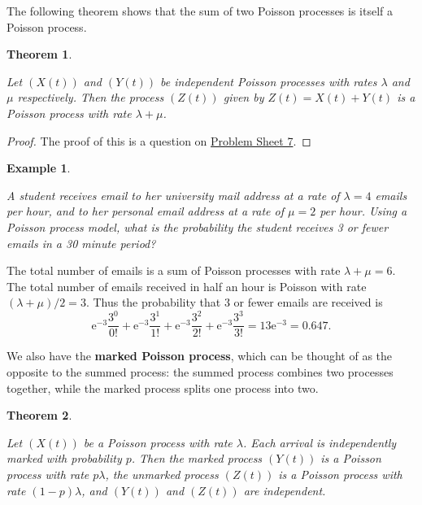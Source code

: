 \documentclass[
  a4paper,
]{article}
\newtheorem{theorem}{Theorem}[section]
\theoremstyle{definition}
\theoremstyle{definition}
\newtheorem{example}{Example}[section]
\theoremstyle{definition}
\theoremstyle{remark}
\begin{document}
The following theorem shows that the sum of two Poisson processes is itself a Poisson process.

\begin{theorem}
\protect\hypertarget{thm:summed}{}\label{thm:summed}

Let \((X(t))\) and \((Y(t))\) be independent Poisson processes with rates \(\lambda\) and \(\mu\) respectively. Then the process \((Z(t))\) given by \(Z(t) = X(t) + Y(t)\) is a Poisson process with rate \(\lambda+\mu\).

\end{theorem}

\begin{proof}

The proof of this is a question on \protect\hyperlink{P07}{Problem Sheet 7}.

\end{proof}

\begin{example}
\protect\hypertarget{exm:poisson-ex-3}{}\label{exm:poisson-ex-3}

\emph{A student receives email to her university mail address at a rate of \(\lambda = 4\) emails per hour, and to her personal email address at a rate of \(\mu = 2\) per hour. Using a Poisson process model, what is the probability the student receives 3 or fewer emails in a 30 minute period?}

The total number of emails is a sum of Poisson processes with rate \(\lambda + \mu = 6\). The total number of emails received in half an hour is Poisson with rate \((\lambda + \mu)/2 = 3\). Thus the probability that 3 or fewer emails are received is
\[ \mathrm{e}^{-3} \frac{3^0}{0!} + \mathrm{e}^{-3} \frac{3^1}{1!} + \mathrm{e}^{-3} \frac{3^2}{2!} + \mathrm{e}^{-3} \frac{3^3}{3!} = 13\mathrm{e}^{-3} = 0.647 . \]

\end{example}

We also have the \textbf{marked Poisson process}, which can be thought of as the opposite to the summed process: the summed process combines two processes together, while the marked process splits one process into two.

\begin{theorem}
\protect\hypertarget{thm:marked}{}\label{thm:marked}

Let \((X(t))\) be a Poisson process with rate \(\lambda\). Each arrival is independently marked with probability \(p\). Then the marked process \((Y(t))\) is a Poisson process with rate \(p\lambda\), the unmarked process \((Z(t))\) is a Poisson process with rate \((1-p)\lambda\), and \((Y(t))\) and \((Z(t))\) are independent.

\end{theorem}
\end{document}
